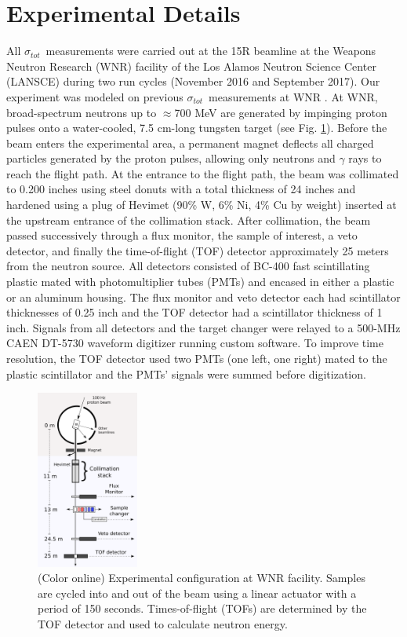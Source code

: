 \documentclass[twocolumn,secnumarabic,amssymb, nobibnotes, aps, prl,
superscriptaddress, nobalancelastpage]{revtex4}
\newcommand{\tot}{\ensuremath{\sigma_{tot}}}
\begin{document}
\section{Experimental Details}
All \tot\ measurements were carried out at the 15R
beamline at the Weapons Neutron Research (WNR) facility of the Los Alamos
Neutron Science Center (LANSCE) during two run cycles (November 2016 and
September 2017). Our experiment was modeled on previous
\tot\ measurements at WNR \cite{Finlay1993,Abfalterer2001,Shane2010}.
At WNR,
broad-spectrum neutrons up
to $\approx$700 MeV are generated by impinging proton pulses onto a water-cooled, 7.5
cm-long tungsten target (see Fig. \ref{ExperimentalApparatus}). Before the beam
enters the experimental area, a
permanent magnet deflects all charged particles generated by the proton pulses, 
allowing only neutrons and $\gamma$ rays to reach the flight path. At the
entrance to the flight path, the beam was collimated to 0.200 inches using steel
donuts with a total thickness of 24 inches and hardened using a plug of Hevimet (90\% W, 6\% 
Ni, 4\% Cu by weight) inserted at the upstream entrance of the
collimation stack. After collimation, the beam passed successively through a flux 
monitor, the sample of interest, a veto detector, and finally the 
time-of-flight (TOF) detector approximately 25 meters from the neutron source.
All detectors consisted of BC-400 fast scintillating plastic mated with 
photomultiplier tubes (PMTs) and encased in either a plastic or
an aluminum housing. The flux monitor and veto detector each had
scintillator thicknesses of 0.25 inch and the TOF detector had a
scintillator thickness of 1 inch. Signals from all detectors and
the target changer were relayed to a 500-MHz CAEN DT-5730 waveform digitizer
running custom software. To improve time resolution, the TOF detector used two
PMTs (one left, one right) mated to the plastic scintillator and the PMTs' signals were 
summed before digitization.

\begin{figure}
    \includegraphics[width=0.3\textwidth]{figures/ExperimentalSetup.png}
    \caption{(Color online) Experimental configuration at WNR facility.
        Samples are cycled into and out of the beam
        using a linear actuator with a period of 150 seconds. Times-of-flight (TOFs) are
    determined by the TOF detector and used to calculate neutron energy.}
    \label{ExperimentalApparatus}
\end{figure}
\end{document}
